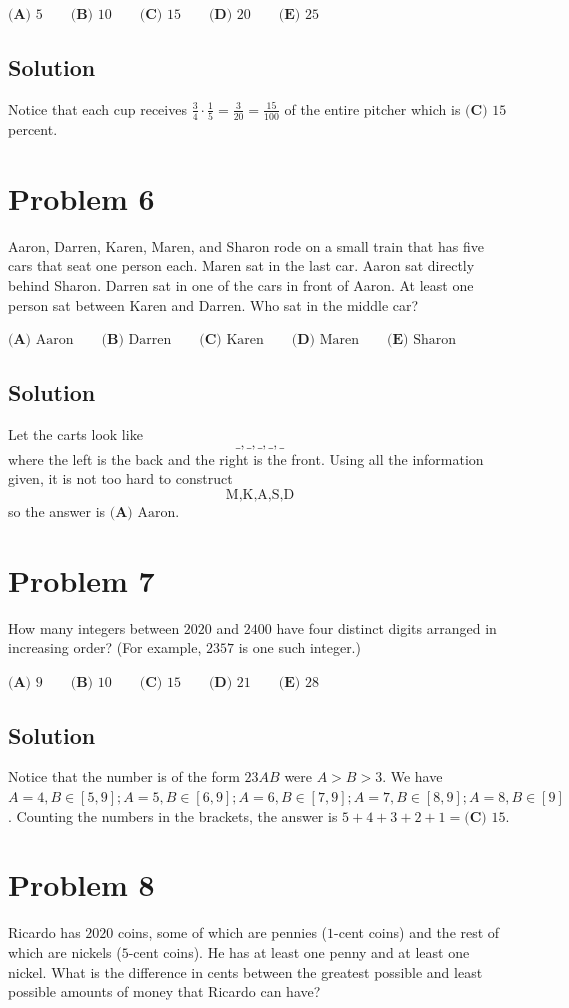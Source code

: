 \documentclass{article}
\begin{document}
$\textbf{(A) }5 \qquad \textbf{(B) }10 \qquad \textbf{(C) }15 \qquad \textbf{(D) }20 \qquad \textbf{(E) }25$
\subsection{Solution}
Notice that each cup receives $\frac 34 \cdot \frac 15=\frac{3}{20}=\frac{15}{100}$ of the entire pitcher which is $\textbf{(C) }15$ percent.

\section{Problem 6}
Aaron, Darren, Karen, Maren, and Sharon rode on a small train that has five cars that seat one person each. Maren sat in the last car. Aaron sat directly behind Sharon. Darren sat in one of the cars in front of Aaron. At least one person sat between Karen and Darren. Who sat in the middle car?

$\textbf{(A) }\text{Aaron} \qquad \textbf{(B) }\text{Darren} \qquad \textbf{(C) }\text{Karen} \qquad \textbf{(D) }\text{Maren}\qquad \textbf{(E) }\text{Sharon}$

\subsection{Solution}
Let the carts look like $$\_,\_,\_,\_,\_$$ where the left is the back and the right is the front. Using all the information given, it is not too hard to construct $$\text{M,K,A,S,D}$$ so the answer is $\textbf{(A) }\text{Aaron}$.
\section{Problem 7}
How many integers between $2020$ and $2400$ have four distinct digits arranged in increasing order? (For example, $2357$ is one such integer.)

$\textbf{(A) }9 \qquad \textbf{(B) }10 \qquad \textbf{(C) }15 \qquad \textbf{(D) }21 \qquad \textbf{(E) }28$
\subsection{Solution}
Notice that the number is of the form $23AB$ were $A>B>3$. We have $A=4,B\in [5,9];A=5,B\in [6,9];A=6,B\in [7,9];A=7,B\in [8,9];A=8,B\in [9]$. Counting the numbers in the brackets, the answer is $5+4+3+2+1=\textbf{(C) }15$.
\section{Problem 8}
Ricardo has $2020$ coins, some of which are pennies ($1$-cent coins) and the rest of which are nickels ($5$-cent coins). He has at least one penny and at least one nickel. What is the difference in cents between the greatest possible and least possible amounts of money that Ricardo can have?
\end{document}
